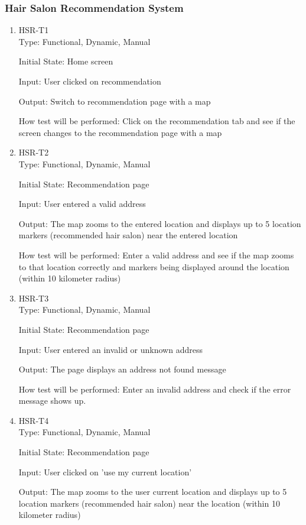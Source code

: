 \documentclass[12pt, titlepage]{article}
\begin{document}
\subsubsection{Hair Salon Recommendation System}
\begin{enumerate}
\item{HSR-T1}\\
Type: Functional, Dynamic, Manual
					
Initial State: Home screen
					
Input: User clicked on recommendation
					
Output: Switch to recommendation page with a map
					
How test will be performed: Click on the recommendation tab and see if the screen changes to the recommendation page with a map
				
\item{HSR-T2}\\
Type: Functional, Dynamic, Manual
					
Initial State: Recommendation page
					
Input: User entered a valid address
					
Output: The map zooms to the entered location and displays up to 5 location markers (recommended hair salon) near the entered location
					
How test will be performed: Enter a valid address and see if the map zooms to that location correctly and markers being displayed around the location (within 10 kilometer radius)

\item{HSR-T3}\\
Type: Functional, Dynamic, Manual
					
Initial State: Recommendation page
					
Input: User entered an invalid or unknown address
					
Output: The page displays an address not found message
					
How test will be performed: Enter an invalid address and check if the error message shows up.
\item{HSR-T4}\\
Type: Functional, Dynamic, Manual
					
Initial State: Recommendation page
					
Input: User clicked on 'use my current location'
					
Output: The map zooms to the user current location and displays up to 5 location markers (recommended hair salon) near the location (within 10 kilometer radius)
					

\end{enumerate}
\end{document}
